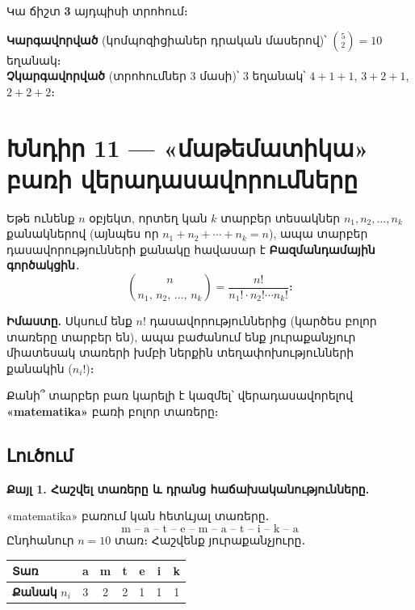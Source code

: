 \documentclass[12pt, a4paper]{article}
\begin{document}
Կա ճիշտ \textbf{3} այդպիսի տրոհում։

\begin{answerbox}
\centering
\textbf{Կարգավորված} (կոմպոզիցիաներ դրական մասերով)՝
$\displaystyle\binom{5}{2} = 10$ եղանակ։\\[4pt]
\textbf{Չկարգավորված} (տրոհումներ 3 մասի)՝
$3$ եղանակ՝ \;$4{+}1{+}1$,\; $3{+}2{+}1$,\; $2{+}2{+}2$։
\end{answerbox}

\newpage
\section{Խնդիր 11 — «մաթեմատիկա» բառի վերադասավորումները}

\begin{theorybox}
Եթե ունենք $n$ օբյեկտ, որտեղ կան $k$ տարբեր տեսակներ $n_1, n_2, \ldots, n_k$
քանակներով (այնպես որ $n_1 + n_2 + \cdots + n_k = n$), ապա տարբեր
դասավորությունների քանակը հավասար է \textbf{Բազմանդամային գործակցին}․
\[
  \binom{n}{n_1,\, n_2,\, \ldots,\, n_k}
  = \frac{n!}{n_1!\cdot n_2!\cdots n_k!} \text{։}
\]

\medskip
\textbf{Իմաստը.}\;
Սկսում ենք $n!$ դասավորություններից (կարծես բոլոր տառերը տարբեր են),
ապա բաժանում ենք յուրաքանչյուր միատեսակ տառերի խմբի ներքին տեղափոխությունների քանակին ($n_i!$)։
\end{theorybox}

\begin{problembox}
Քանի՞ տարբեր բառ կարելի է կազմել՝ վերադասավորելով \textbf{«matematika»} բառի բոլոր տառերը։
\end{problembox}

\subsection*{Լուծում}

\textbf{Քայլ 1. Հաշվել տառերը և դրանց հաճախականությունները.}

«matematika» բառում կան հետևյալ տառերը․
\[
  \text{m -- a -- t -- e -- m -- a -- t -- i -- k -- a}
\]
Ընդհանուր $n = 10$ տառ։ Հաշվենք յուրաքանչյուրը․

\begin{center}
\renewcommand{\arraystretch}{1.2}
\begin{tabular}{lcccccc}
\toprule
\textbf{Տառ} & a & m & t & e & i & k \\
\midrule
\textbf{Քանակ} $n_i$ & 3 & 2 & 2 & 1 & 1 & 1 \\
\bottomrule
\end{tabular}
\end{center}
\end{document}
